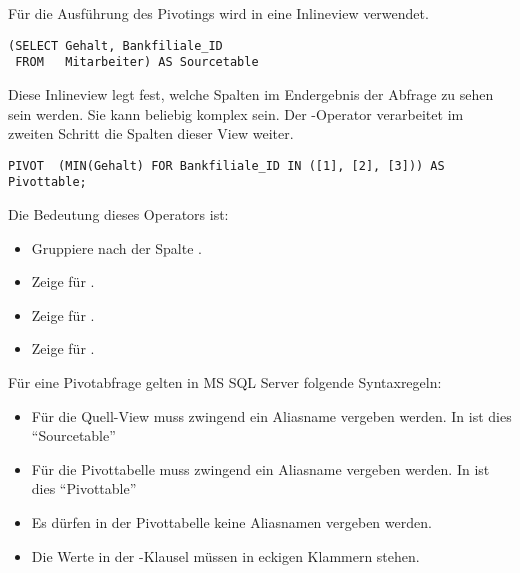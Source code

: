           F\"ur die Ausf\"uhrung des Pivotings wird in  eine Inlineview verwendet.
          \begin{lstlisting}[language=ms_sql,caption={Die Inlineview},label=sql06_24]
(SELECT Gehalt, Bankfiliale_ID
 FROM   Mitarbeiter) AS Sourcetable
          \end{lstlisting}
          Diese Inlineview legt fest, welche Spalten im Endergebnis der Abfrage zu sehen sein werden. Sie kann beliebig komplex sein. Der -Operator verarbeitet im zweiten Schritt die Spalten dieser View weiter.
          \begin{lstlisting}[language=ms_sql,caption={Der \languageorasql{PIVOT}-Operator},label=sql06_25]
PIVOT  (MIN(Gehalt) FOR Bankfiliale_ID IN ([1], [2], [3])) AS Pivottable;
          \end{lstlisting}
\clearpage
          Die Bedeutung dieses Operators ist:
          \begin{itemize}
            \item Gruppiere nach der Spalte .
            \item Zeige  f\"ur .
            \item Zeige  f\"ur .
            \item Zeige  f\"ur .
          \end{itemize}
          F\"ur eine Pivotabfrage gelten in MS SQL Server folgende Syntaxregeln:
          \begin{itemize}
            \item F\"ur die Quell-View muss zwingend ein Aliasname vergeben werden. In  ist dies \enquote{Sourcetable}
            \item F\"ur die Pivottabelle muss zwingend ein Aliasname vergeben
werden. In  ist dies \enquote{Pivottable}
						\item Es d\"urfen in der Pivottabelle keine
Aliasnamen vergeben werden.
            \item Die Werte in der -Klausel m\"ussen in eckigen Klammern stehen.
          \end{itemize}
